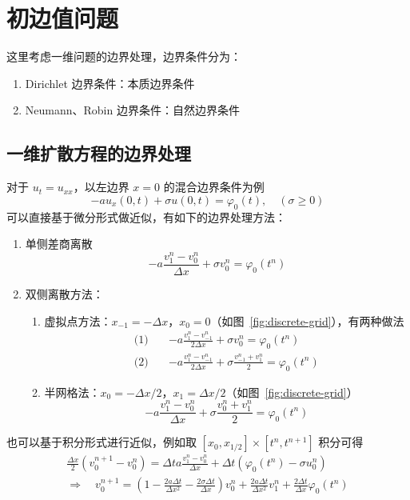 \chapter{初边值问题}

这里考虑一维问题的边界处理，边界条件分为：
\begin{enumerate}
    \item Dirichlet 边界条件：本质边界条件
    \item Neumann、Robin 边界条件：自然边界条件
\end{enumerate}

\section{一维扩散方程的边界处理}

对于 $u_t =  u_{xx}$，以左边界 $x=0$ 的混合边界条件为例
\[
    - a u_x(0,t) + \sigma u(0,t) = \varphi_0(t),\quad (\sigma \ge 0)
\]
可以直接基于微分形式做近似，有如下的边界处理方法：
\begin{enumerate}
    \item 单侧差商离散
          \[
              -a \frac{v_1^n - v_0^n}{\Delta x} + \sigma v_0^n = \varphi_0(t^n)
          \]
    \item 双侧离散方法：
          \begin{enumerate}
              \item 虚拟点方法：$x_{-1} = - \Delta x$，$x_0 = 0$（如图~\ref{fig:discrete-grid}），有两种做法
                    \begin{align*}
                        \text{(1)} \quad & -a \frac{v_1^n - v_{-1}^n}{2\Delta x} + \sigma v_0^n = \varphi_0(t^n)
                        \\
                        \text{(2)} \quad & -a \frac{v_1^n - v_{-1}^n}{2\Delta x} + \sigma \frac{v_{-1}^n + v_1^n }2  = \varphi_0(t^n)
                    \end{align*}
              \item 半网格法：$x_0 = -{\Delta x}/2$，$x_1 = {\Delta x}/2$（如图~\ref{fig:discrete-grid}）
                    \[
                        -a \frac{v_1^n - v_{0}^n}{\Delta x} + \sigma \frac{v_0^n + v_1^n}2 = \varphi_0(t^n)
                    \]
          \end{enumerate}
\end{enumerate}
也可以基于积分形式进行近似，例如取 $[x_0,x_{1/2}] \times [t^n,t^{n+1}]$ 积分可得
\begin{gather*}
    \frac{\Delta x}2 (v_0^{n+1} - v_0^n)
    = \Delta t a \frac{v_1^n - v_0^n}{\Delta x} + \Delta t (\varphi_0(t^n) - \sigma u_0^n)
    \\
    \Rightarrow \quad  v_0^{n+1} = \left(1 - \frac{2 a \Delta t}{\Delta x^2} - \frac{2\sigma \Delta t}{\Delta x}\right) v_0^n
    + \frac{2 a \Delta t}{\Delta x^2} v_1^n + \frac{2\Delta t}{\Delta x} \varphi_0(t^n)
\end{gather*}


